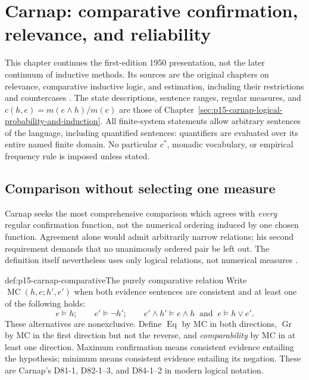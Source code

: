 \chapter{Carnap: comparative confirmation, relevance, and reliability}
\label{sec:p15-carnap-confirmation-relevance-and-reliability}

This chapter continues the first-edition 1950 presentation, not the later
continuum of inductive methods. Its sources are the original chapters
on relevance, comparative inductive logic, and estimation, including
their restrictions and countercases
\cite[secs.~65--76, 79--88, 98--107]{Carnap1950Probability}.
The state descriptions, sentence ranges, regular measures, and
\(c(h,e)=m(e\land h)/m(e)\) are those of
Chapter~\ref{sec:p15-carnap-logical-probability-and-induction}.
All finite-system statements allow arbitrary sentences of the language,
including quantified sentences: quantifiers are evaluated over its entire
named finite domain. No particular \(c^*\), monadic vocabulary, or
empirical frequency rule is imposed unless stated.

\section{Comparison without selecting one measure}
\label{sec:p15-carnap-comparative}

Carnap seeks the most comprehensive comparison which agrees with
\emph{every} regular confirmation function, not the numerical ordering
induced by one chosen function. Agreement alone would admit arbitrarily
narrow relations; his second requirement demands that no unanimously
ordered pair be left out. The definition itself nevertheless uses only
logical relations, not numerical measures
\cite[secs.~79--81, pp.~428--440]{Carnap1950Probability}.

\begin{hbdefinition}{def:p15-carnap-comparative}{The purely comparative relation}
Write \(\operatorname{MC}(h,e;h',e')\) when both evidence sentences
are consistent and at least one of the following holds:
\[
 e\models h;\qquad e'\models\neg h';\qquad
 e'\land h'\models e\land h\ \text{ and }\ e\models h\lor e'.
\]
These alternatives are nonexclusive. Define \(\operatorname{Eq}\)
by MC in both directions, \(\operatorname{Gr}\) by MC in the first
direction but not the reverse, and \emph{comparability} by MC in at
least one direction. Maximum confirmation means consistent evidence
entailing the hypothesis; minimum means consistent evidence entailing
its negation. These are Carnap's D81-1, D82-1--3, and D84-1--2 in
modern logical notation.
\end{hbdefinition}

